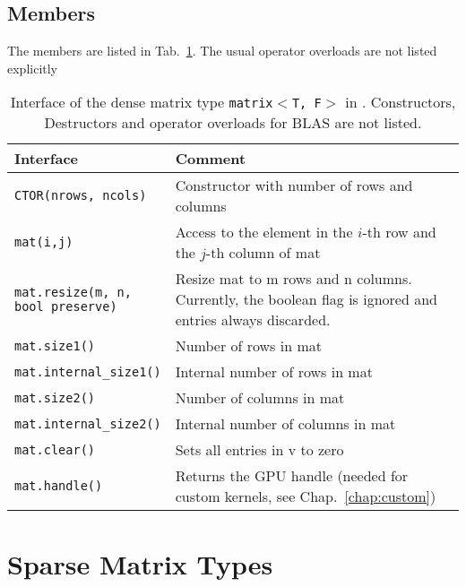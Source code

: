 \subsection{Members}

The members are listed in Tab.~\ref{tab:matrix-interface}. The usual operator overloads are not listed explicitly

\begin{table}[tb]
\begin{center}
\begin{tabular}{p{6.5cm}|p{8.5cm}}
Interface & Comment\\
\hline
\texttt{CTOR(nrows, ncols)}    & Constructor with number of rows and columns \\
\texttt{mat(i,j)}    & Access to the element in the $i$-th row and the $j$-th column of mat \\
\parbox{6cm}{\texttt{mat.resize(m, n, \\
           \hphantom{mat.resize(}bool preserve)}}    & Resize mat to m rows and n columns. Currently, the boolean flag is ignored and entries always discarded. \\
\texttt{mat.size1()}            & Number of rows in mat \\
\texttt{mat.internal\_size1()}   & Internal number of rows in mat \\
\texttt{mat.size2()}            & Number of columns in mat \\
\texttt{mat.internal\_size2()}   & Internal number of columns in mat \\
\texttt{mat.clear()}   & Sets all entries in v to zero \\
\texttt{mat.handle()}  & Returns the GPU handle (needed for custom kernels, see Chap.~\ref{chap:custom})
\end{tabular}
\caption{Interface of the dense matrix type \texttt{matrix$<$T, F$>$} in
\ViennaCL. Constructors, Destructors and operator overloads for BLAS are not
listed.}
\label{tab:matrix-interface}
\end{center}
\end{table}



\section{Sparse Matrix Types}

